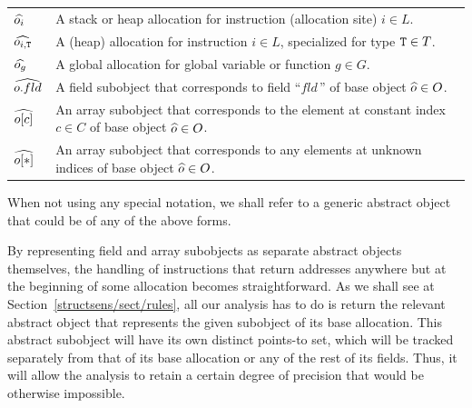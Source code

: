 \noindent
\begin{tabular}{@{--\ }l@{\quad}p{}}
  $\widehat{o_i}$
  & A stack or heap allocation for instruction (allocation site) $i \in L$.
  \\[3pt]
  $\widehat{o_{i,\texttt{T}}}$
  & A (heap) allocation for instruction $i \in L$, specialized for type
    $\texttt{T} \in T$.
  \\[3pt]
  $\widehat{o_{g}}$
  & A global allocation for global variable or function $g \in G$.
  \\[3pt]
  $\widehat{o.fld}$
  & A field subobject that corresponds to field ``$fld\,$'' of base object
    $\widehat{o} \in O$.
  \\[3pt]
  $\widehat{o[c]}$
  & An array subobject that corresponds to the element at constant
    index $c \in C$ of base object $\widehat{o} \in O$.
  \\[1pt]
  $\widehat{o[*]}$
  & An array subobject that corresponds to any elements at unknown
    indices of base object $\widehat{o} \in O$.
  \\
\end{tabular}

\noindent
When not using any special notation, we shall refer to a generic
abstract object that could be of any of the above forms.

By representing field and array subobjects as separate abstract
objects themselves, the handling of instructions that return addresses
anywhere but at the beginning of some allocation becomes
straightforward. As we shall see at
Section~\ref{structsens/sect/rules}, all our analysis has to do is
return the relevant abstract object that represents the given
subobject of its base allocation. This abstract subobject will have
its own distinct points-to set, which will be tracked separately from
that of its base allocation or any of the rest of its fields. Thus, it
will allow the analysis to retain a certain degree of precision that
would be otherwise impossible.

